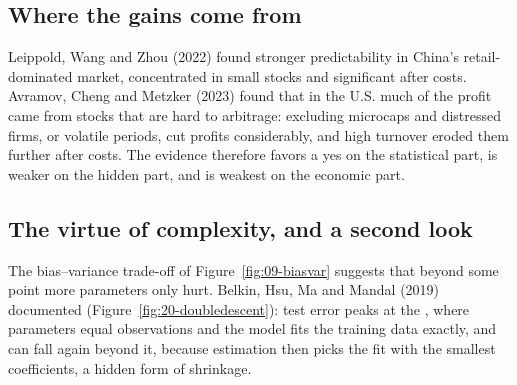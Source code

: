 \subsection{Where the gains come from}

Leippold, Wang and Zhou (2022) found stronger predictability in China's retail-dominated market, concentrated in small stocks and significant after costs. Avramov, Cheng and Metzker (2023) found that in the U.S. much of the profit came from stocks that are hard to arbitrage: excluding microcaps and distressed firms, or volatile periods, cut profits considerably, and high turnover eroded them further after costs. The evidence therefore favors a yes on the statistical part, is weaker on the hidden part, and is weakest on the economic part.

\subsection{The virtue of complexity, and a second look}
\label{sec:20-complexity}

The bias--variance trade-off of Figure~\ref{fig:09-biasvar} suggests that beyond some point more parameters only hurt. Belkin, Hsu, Ma and Mandal (2019) documented  (Figure~\ref{fig:20-doubledescent}): test error peaks at the , where parameters equal observations and the model fits the training data exactly, and can fall again beyond it, because estimation then picks the fit with the smallest coefficients, a hidden form of shrinkage.



